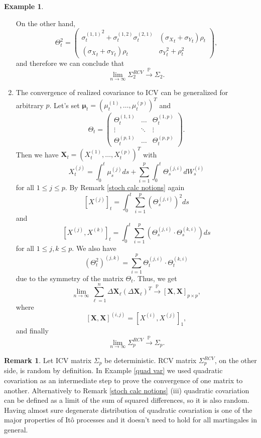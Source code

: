 \documentclass[a4paper,11pt]{article}
\theoremstyle{plain}
\theoremstyle{definition}
\newtheorem{exmp}[thm]{Example}
\newtheorem{rmrk}[thm]{Remark}
\begin{document}
\begin{exmp}
\begin{enumerate}
			On the other hand,
			\[ \Theta_t^2 = \begin{pmatrix}
			{\sigma^{(1,1)}_t}^2 + {\sigma^{(1,2)}_t}{\sigma^{(2,1)}_t} & ({\sigma_X}_t + {\sigma_Y}_t)\rho_t \\
			({\sigma_X}_t + {\sigma_Y}_t)\rho_t  & {\sigma_Y}_t^2 + \rho_t^2
			\end{pmatrix}, \]
			and therefore we can conclude that
			\[ \lim_{n \rightarrow \infty} \Sigma_2^{RCV} \xrightarrow{\mathbb{P}} \Sigma_2. \]
			\item 
			The convergence of realized covariance to ICV can be generalized for arbitrary $p$. Let's set $\boldsymbol{\mu}_t = (\mu_t^{(1)}, \dots, \mu_t^{(p)})^T$ and
			\[ 
			\Theta_t = \begin{pmatrix}
			\Theta_t^{(1, 1)} & \dots & \Theta_t^{(1, p)} \\
			\vdots & \ddots & \vdots \\
			\Theta_t^{(p, 1)} & \dots & \Theta_t^{(p, p)}
			\end{pmatrix}.
			\]
			Then we have $\mathbf{X}_t = (X_t^{(1)}, \dots, X_t^{(p)})^T$ with
			\[X_t^{(j)} =  \int_0^t\mu_s^{(j)} ds +  \sum_{i=1}^{p} \int_0^t \Theta_s^{(j, i)} dW_s^{(i)} \]			
			for all $1 \leq j \leq p$. By Remark \ref{stoch calc notions} again
			\[ [X^{(j)}] _t= \int_0^t\sum_{i=1}^{p} (\Theta_s^{(j, i)})^2ds \]
			and
			\[ [X^{(j)}, X^{(k)}]_t = \int_0^t\sum_{i=1}^{p} (\Theta_s^{(j, i)} \cdot \Theta_s^{(k, i)}) ds \]
			for all $1 \leq j,k \leq p$.
			We also have
			\[ 
			(\Theta_t^2)^{(j, k)} = \sum_{i=1}^{p} \Theta_t^{(j, i)} \cdot \Theta_t^{(k, i)}
			\]
			due to the symmetry of the matrix $\Theta_t$. Thus, we get
			\[  \lim_{n \rightarrow \infty} \sum_{\ell=1}^{n}\Delta \mathbf{X}_\ell(\Delta \mathbf{X}_\ell)^T \xrightarrow{\mathbb{P}} [\mathbf{X}, \mathbf{X}]_{p \times p}, \]
			where 
			\[[\mathbf{X}, \mathbf{X}]^{(i,j)} = [X^{(i)}, X^{(j)}]_1, \]
			and finally
			\[ \lim_{n \rightarrow \infty} \Sigma_p^{RCV} \xrightarrow{\mathbb{P}} \Sigma_p. \]
		\end{enumerate}
		
		\begin{rmrk}
			Let ICV matrix $\Sigma_p$ be deterministic. RCV matrix $\Sigma_p^{RCV}$, on the other side, is random by definition. In Example \ref{quad var} we used quadratic covariation as an intermediate step to prove the convergence of one matrix to another. Alternatively to Remark \ref{stoch calc notions} (iii) quadratic covariation can be defined as a limit of the sum of squared differences, so it is also random. Having almost sure degenerate distribution of quadratic covariation is one of the major properties of Itô processes and it doesn't need to hold for all martingales in general.
		\end{rmrk}
		
	\end{exmp}
	
\end{document}
